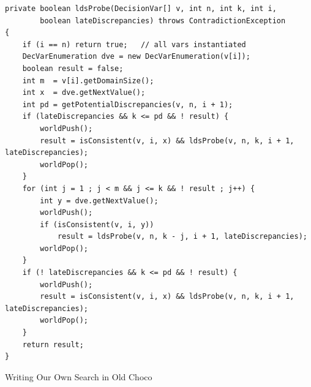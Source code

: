 \documentclass{beamer}
\begin{document}
\begin{lrbox}{\mycodeboxb}
    \tiny\ttfamily
\begin{lstlisting}
private boolean ldsProbe(DecisionVar[] v, int n, int k, int i,
        boolean lateDiscrepancies) throws ContradictionException
{
    if (i == n) return true;   // all vars instantiated
    DecVarEnumeration dve = new DecVarEnumeration(v[i]);
    boolean result = false;
    int m  = v[i].getDomainSize();
    int x  = dve.getNextValue();
    int pd = getPotentialDiscrepancies(v, n, i + 1);
    if (lateDiscrepancies && k <= pd && ! result) {
        worldPush();
        result = isConsistent(v, i, x) && ldsProbe(v, n, k, i + 1, lateDiscrepancies);
        worldPop();
    }
    for (int j = 1 ; j < m && j <= k && ! result ; j++) {
        int y = dve.getNextValue();
        worldPush();
        if (isConsistent(v, i, y))
            result = ldsProbe(v, n, k - j, i + 1, lateDiscrepancies);
        worldPop();
    }
    if (! lateDiscrepancies && k <= pd && ! result) {
        worldPush();
        result = isConsistent(v, i, x) && ldsProbe(v, n, k, i + 1, lateDiscrepancies);
        worldPop();
    }
    return result;
}
\end{lstlisting}
\end{lrbox}

\begin{frame}{Writing Our Own Search in Old Choco}
\end{frame}
\end{document}
